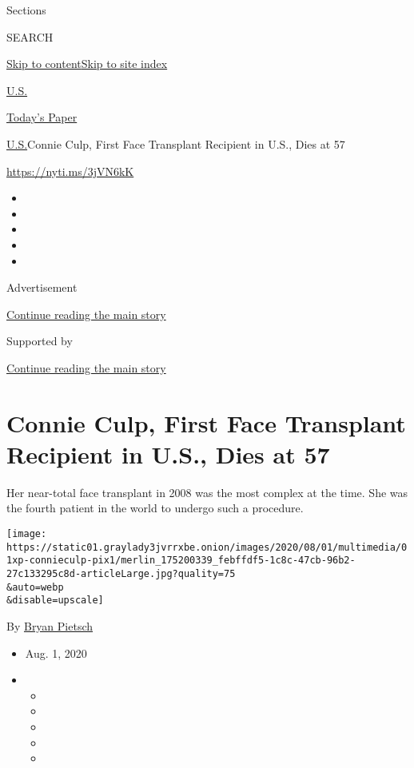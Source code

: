 Sections

SEARCH

\protect\hyperlink{site-content}{Skip to
content}\protect\hyperlink{site-index}{Skip to site index}

\href{https://www.nytimes3xbfgragh.onion/section/us}{U.S.}

\href{https://myaccount.nytimes3xbfgragh.onion/auth/login?response_type=cookie\&client_id=vi}{}

\href{https://www.nytimes3xbfgragh.onion/section/todayspaper}{Today's
Paper}

\href{/section/us}{U.S.}\textbar{}Connie Culp, First Face Transplant
Recipient in U.S., Dies at 57

\url{https://nyti.ms/3jVN6kK}

\begin{itemize}
\item
\item
\item
\item
\item
\end{itemize}

Advertisement

\protect\hyperlink{after-top}{Continue reading the main story}

Supported by

\protect\hyperlink{after-sponsor}{Continue reading the main story}

\hypertarget{connie-culp-first-face-transplant-recipient-in-us-dies-at-57}{%
\section{Connie Culp, First Face Transplant Recipient in U.S., Dies at
57}\label{connie-culp-first-face-transplant-recipient-in-us-dies-at-57}}

Her near-total face transplant in 2008 was the most complex at the time.
She was the fourth patient in the world to undergo such a procedure.

\texttt{[image: https://static01.graylady3jvrrxbe.onion/images/2020/08/01/multimedia/01xp-connieculp-pix1/merlin\_175200339\_febffdf5-1c8c-47cb-96b2-27c133295c8d-articleLarge.jpg?quality=75\\\&auto=webp\\\&disable=upscale]}

By \href{https://www.nytimes3xbfgragh.onion/by/bryan-pietsch}{Bryan
Pietsch}

\begin{itemize}
\item
  Aug. 1, 2020
\item
  \begin{itemize}
  \item
  \item
  \item
  \item
  \item
  \end{itemize}
\end{itemize}

